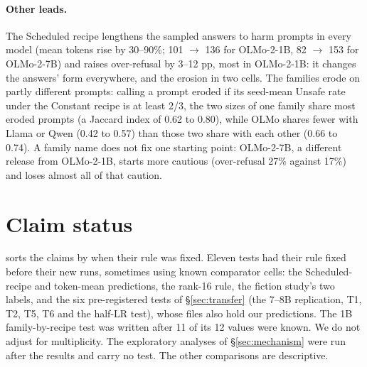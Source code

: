 \documentclass[11pt]{article}
\begin{document}
\paragraph{Other leads.} The Scheduled recipe lengthens the sampled answers to
harm prompts in every model (mean tokens rise by 30--90\%; 101 $\to$ 136 for
OLMo-2-1B, 82 $\to$ 153 for OLMo-2-7B) and raises over-refusal by 3--12 pp,
most in OLMo-2-1B: it changes the answers' form everywhere, and the erosion in
two cells. The families erode on partly different prompts: calling a prompt
eroded if its seed-mean Unsafe rate under the Constant recipe is at least
2/3, the two sizes of one family share most eroded prompts (a Jaccard index
of 0.62 to 0.80), while OLMo shares fewer with Llama or Qwen (0.42 to 0.57)
than those two share with each other (0.66 to 0.74). A family name does not fix one
starting point: OLMo-2-7B, a different release from OLMo-2-1B, starts more
cautious (over-refusal 27\% against 17\%) and loses almost all of that
caution.

\FloatBarrier
\section{Claim status}
\label{app:claims}

 sorts the claims by when their rule was fixed. Eleven tests
had their rule fixed before their new runs, sometimes using known comparator
cells: the Scheduled-recipe and token-mean
predictions, the rank-16 rule, the fiction study's two labels, and the six
pre-registered tests of \S\ref{sec:transfer} (the 7--8B replication, T1, T2,
T5, T6 and the half-LR test), whose files also hold our predictions. The 1B
family-by-recipe test was written after 11 of its 12 values were known. We do
not adjust for multiplicity. The exploratory analyses of \S\ref{sec:mechanism}
were run after the results and carry no test. The other comparisons are
descriptive.
\end{document}
